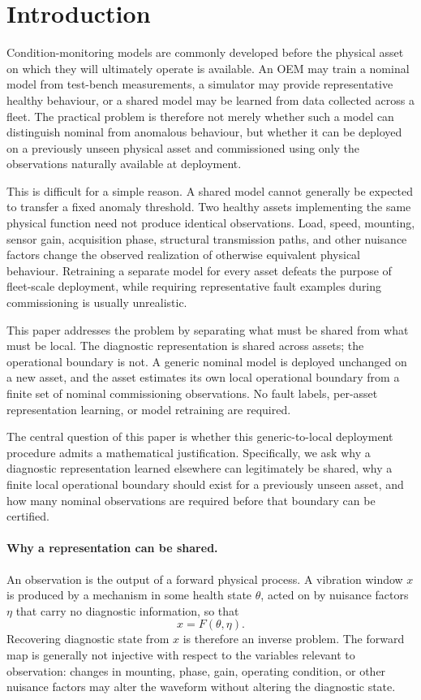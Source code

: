 \documentclass[a4paper]{cas-sc}
\begin{document}
\section{Introduction}
\label{sec:introduction}

Condition-monitoring models are commonly developed before the physical asset on
which they will ultimately operate is available. An OEM may train a nominal
model from test-bench measurements, a simulator may provide representative
healthy behaviour, or a shared model may be learned from data collected across
a fleet. The practical problem is therefore not merely whether such a model can
distinguish nominal from anomalous behaviour, but whether it can be deployed on
a previously unseen physical asset and commissioned using only the observations
naturally available at deployment.

This is difficult for a simple reason. A shared model cannot generally be
expected to transfer a fixed anomaly threshold. Two healthy assets implementing
the same physical function need not produce identical observations. Load,
speed, mounting, sensor gain, acquisition phase, structural transmission paths,
and other nuisance factors change the observed realization of otherwise
equivalent physical behaviour. Retraining a separate model for every asset
defeats the purpose of fleet-scale deployment, while requiring representative
fault examples during commissioning is usually unrealistic.

This paper addresses the problem by separating what must be shared from what
must be local. The diagnostic representation is shared across assets; the
operational boundary is not. A generic nominal model is deployed unchanged on
a new asset, and the asset estimates its own local operational boundary from a
finite set of nominal commissioning observations. No fault labels, per-asset
representation learning, or model retraining are required.

The central question of this paper is whether this generic-to-local deployment
procedure admits a mathematical justification. Specifically, we ask why a
diagnostic representation learned elsewhere can legitimately be shared, why a
finite local operational boundary should exist for a previously unseen asset,
and how many nominal observations are required before that boundary can be
certified.

\paragraph{Why a representation can be shared.}
An observation is the output of a forward physical process. A vibration window
\(x\) is produced by a mechanism in some health state \(\theta\), acted on by
nuisance factors \(\eta\) that carry no diagnostic information, so that
\[
    x = F(\theta,\eta).
\]
Recovering diagnostic state from \(x\) is therefore an inverse problem. The
forward map is generally not injective with respect to the variables relevant
to observation: changes in mounting, phase, gain, operating condition, or
other nuisance factors may alter the waveform without altering the diagnostic
state.
\end{document}
